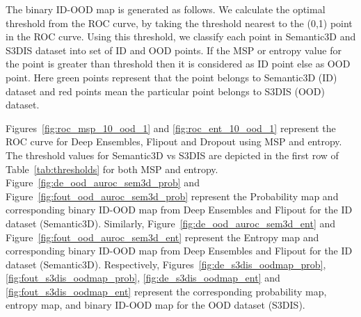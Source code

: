     The binary ID-OOD map is generated as follows. We calculate the optimal threshold from the ROC curve, by taking the threshold nearest to the (0,1) point in the ROC curve.
    Using this threshold, we classify each point in Semantic3D and S3DIS dataset into set of ID and OOD points.
    If the MSP or entropy value for the point is greater than threshold then it is considered as ID point else as OOD point.
    Here green points represent that the point belongs to Semantic3D (ID) dataset and red points mean the particular point belongs to S3DIS (OOD) dataset.
    
    Figures~\ref{fig:roc_msp_10_ood_1} and \ref{fig:roc_ent_10_ood_1} represent the ROC curve for Deep Ensembles, Flipout and Dropout using MSP and entropy.
    The threshold values for Semantic3D vs S3DIS are depicted in the first row of Table~\ref{tab:thresholds} for both MSP and entropy.
    Figure~\ref{fig:de_ood_auroc_sem3d_prob} and Figure~\ref{fig:fout_ood_auroc_sem3d_prob} represent the Probability map and corresponding binary ID-OOD map from Deep Ensembles and Flipout for the ID dataset (Semantic3D).
    Similarly, Figure~\ref{fig:de_ood_auroc_sem3d_ent} and Figure~\ref{fig:fout_ood_auroc_sem3d_ent} represent the Entropy map and corresponding binary ID-OOD map from Deep Ensembles and Flipout for the ID dataset (Semantic3D).
    Respectively, Figures~\ref{fig:de_s3dis_oodmap_prob}, \ref{fig:fout_s3dis_oodmap_prob}, \ref{fig:de_s3dis_oodmap_ent} and \ref{fig:fout_s3dis_oodmap_ent} represent the corresponding probability map, entropy map, and binary ID-OOD map for the OOD dataset (S3DIS).
    

